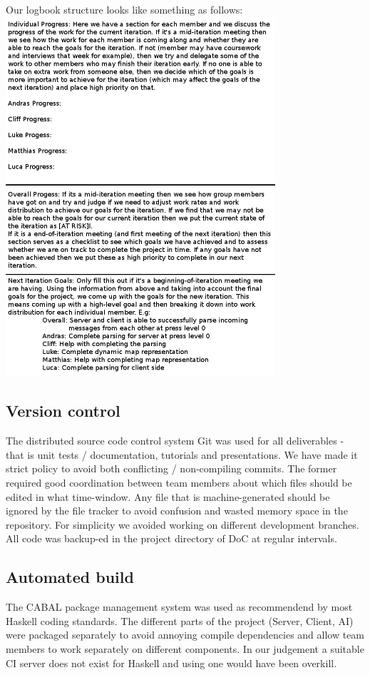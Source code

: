\documentclass[11pt]{article} \usepackage{fullpage} \usepackage{cite}
\begin{document}
Our logbook structure looks like something as follows:
\\ \includegraphics[width=100mm]{logbooktemplate.png}


\subsection{Version control}
The distributed source code control system Git was used for all deliverables -
that is unit tests / documentation, tutorials and presentations. We have made it
strict policy to avoid both conflicting / non-compiling commits. The former
required good coordination between team members about which files should be
edited in what time-window. Any file that is machine-generated should be ignored
by the file tracker to avoid confusion and wasted memory space in the
repository. For simplicity we avoided working on different development
branches. All code was backup-ed in the project directory of DoC at regular
intervals.

\subsection{Automated build}
The CABAL package management system was used as recommendend by most Haskell
coding standards. The different parts of the project (Server, Client, AI) were
packaged separately to avoid annoying compile dependencies and allow team
members to work separately on different components. In our judgement a suitable
CI server does not exist for Haskell and using one would have been overkill.
\end{document}
